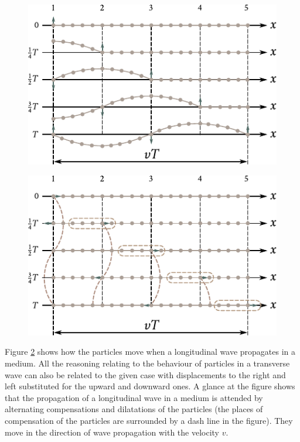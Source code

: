 \begin{figure}[t]
	\begin{center}
		\includegraphics[scale=1]{figures/ch_14/fig_14_1.pdf}
		\caption[]{}
		\label{fig:14_1}
	\end{center}
	\vspace{-0.8cm}
\end{figure}

\begin{figure}[t]
	\begin{center}
		\includegraphics[scale=1]{figures/ch_14/fig_14_2.pdf}
		\caption[]{}
		\label{fig:14_2}
	\end{center}
	\vspace{-0.8cm}
\end{figure}

Figure \ref{fig:14_2} shows how the particles move when a longitudinal wave propagates in a medium.
All the reasoning relating to the behaviour of particles in a transverse wave can also be related to the given case with displacements to the right and left substituted for the upward and downward ones.
A glance at the figure shows that the propagation of a longitudinal wave in a medium is attended by alternating compensations and dilatations of the particles (the places of compensation of the particles are surrounded by a dash line in the figure).
They move in the direction of wave propagation with the velocity $v$.

